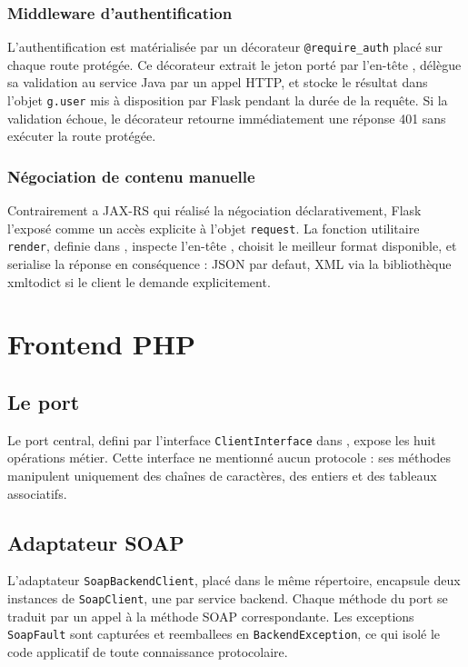 \subsubsection{Middleware d'authentification}

L'authentification est matérialisée par un décorateur \texttt{@require\_auth} placé sur chaque route protégée. Ce décorateur extrait le jeton porté par l'en-tête , délègue sa validation au service Java par un appel HTTP, et stocke le résultat dans l'objet \texttt{g.user} mis à disposition par Flask pendant la durée de la requête. Si la validation échoue, le décorateur retourne immédiatement une réponse 401 sans exécuter la route protégée.

\subsubsection{Négociation de contenu manuelle}

Contrairement a JAX-RS qui réalisé la négociation déclarativement, Flask l'exposé comme un accès explicite à l'objet \texttt{request}. La fonction utilitaire \texttt{render}, definie dans , inspecte l'en-tête , choisit le meilleur format disponible, et serialise la réponse en conséquence : JSON par defaut, XML via la bibliothèque xmltodict si le client le demande explicitement.

\section{Frontend PHP}

\subsection{Le port}

Le port central, defini par l'interface \texttt{ClientInterface} dans , expose les huit opérations métier. Cette interface ne mentionné aucun protocole : ses méthodes manipulent uniquement des chaînes de caractères, des entiers et des tableaux associatifs.

\subsection{Adaptateur SOAP}

L'adaptateur \texttt{SoapBackendClient}, placé dans le même répertoire, encapsule deux instances de \texttt{SoapClient}, une par service backend. Chaque méthode du port se traduit par un appel à la méthode SOAP correspondante. Les exceptions \texttt{SoapFault} sont capturées et reemballees en \texttt{BackendException}, ce qui isolé le code applicatif de toute connaissance protocolaire.

